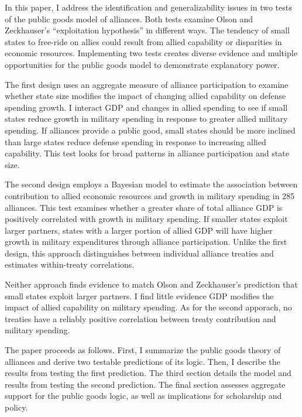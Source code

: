\documentclass[12pt]{article}
\begin{document}
In this paper, I address the identification and generalizability issues in two tests of the public goods model of alliances.  
Both tests examine Olson and Zeckhauser's ``exploitation hypothesis'' in different ways.   
The tendency of small states to free-ride on allies could result from allied capability or disparities in economic resources.
Implementing two tests creates diverse evidence and multiple opportunities for the public goods model to demonstrate explanatory power. 


The first design uses an aggregate measure of alliance participation to examine whether state size modifies the impact of changing allied capability on defense spending growth.
I interact GDP and changes in allied spending to see if small states reduce growth in military spending in response to greater allied military spending. 
If alliances provide a public good, small states should be more inclined than large states reduce defense spending in response to increasing allied capability. 
This test looks for broad patterns in alliance participation and state size. 


The second design employs a Bayesian model to estimate the association between contribution to allied economic resources and growth in military spending in 285 alliances. 
This test examines whether a greater share of total alliance GDP is positively correlated with growth in military spending. 
If smaller states exploit larger partners, states with a larger portion of allied GDP will have higher growth in military expenditures through alliance participation.
Unlike the first design, this approach distinguishes between individual alliance treaties and estimates within-treaty correlations. 


Neither approach finds evidence to match Olson and Zeckhauser's prediction that small states exploit larger partners. 
I find little evidence GDP modifies the impact of allied capability on military spending.
As for the second apporach, no treaties have a reliably positive correlation between treaty contribution and military spending. 


The paper proceeds as follows.
First, I summarize the public goods theory of alliances and derive two testable predictions of its logic.
Then, I describe the results from testing the first prediction.
The third section details the model and results from testing the second prediction. 
The final section assesses aggregate support for the public goods logic, as well as implications for scholarship and policy. 
\end{document}

